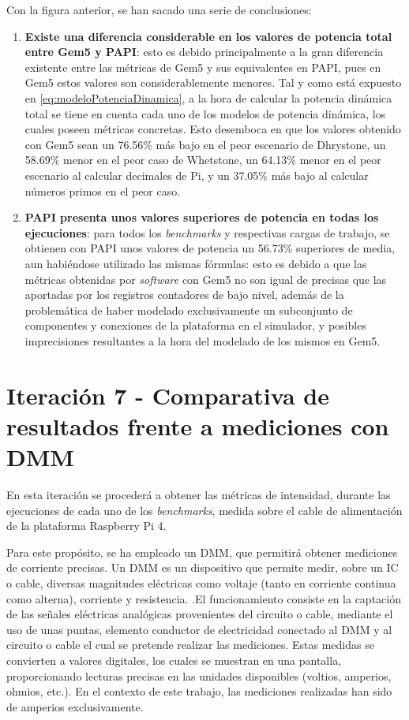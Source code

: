Con la figura anterior, se han sacado una serie de conclusiones:

\begin{enumerate}%
    \item \textbf{Existe una diferencia considerable en los valores de potencia total entre Gem5 y PAPI}: esto es debido principalmente a la gran diferencia existente entre las métricas de Gem5 y sus equivalentes en PAPI, pues en Gem5 estos valores son considerablemente menores. Tal y como está expuesto en \ref{eq:modeloPotenciaDinamica}, a la hora de calcular la potencia dinámica total se tiene en cuenta cada uno de los modelos de potencia dinámica, los cuales poseen métricas concretas. Esto desemboca en que los valores obtenido con Gem5 sean un 76.56\% más bajo en el peor escenario de Dhrystone, un 58.69\% menor en el peor caso de Whetstone, un 64.13\% menor en el peor escenario al calcular decimales de Pi, y un 37.05\% más bajo al calcular números primos en el peor caso.

    \item \textbf{PAPI presenta unos valores superiores de potencia en todas los ejecuciones}: para todos los \textit{benchmarks} y respectivas cargas de trabajo, se obtienen con PAPI unos valores de potencia un 56.73\% superiores de media, aun habiéndose utilizado las mismas fórmulas: esto es debido a que las métricas obtenidas por \textit{software} con Gem5 no son igual de precisas que las aportadas por los registros contadores de bajo nivel, además de la problemática de haber modelado exclusivamente un subconjunto de componentes y conexiones de la plataforma en el simulador, y posibles imprecisiones resultantes a la hora del modelado de los mismos en Gem5.
\end{enumerate}

\section{Iteración 7 - Comparativa de resultados frente a mediciones con DMM}

En esta iteración se procederá a obtener las métricas de intensidad, durante las ejecuciones de cada uno de los \textit{benchmarks}, medida sobre el cable de alimentación de la plataforma Raspberry Pi 4. 

Para este propósito, se ha empleado un \ac{DMM}, que permitirá obtener mediciones de corriente precisas. Un DMM es un dispositivo que permite medir, sobre un \ac{IC} o cable, diversas magnitudes eléctricas como voltaje (tanto en corriente continua como alterna), corriente y resistencia. \cite{funcionamiento-dmm}.El funcionamiento consiste en la captación de las señales eléctricas analógicas provenientes del circuito o cable, mediante el uso de unas puntas, elemento conductor de electricidad conectado al DMM y al circuito o cable el cual se pretende realizar las mediciones. Estas medidas se convierten a valores digitales, los cuales se muestran en una pantalla, proporcionando lecturas precisas en las unidades disponibles (voltios, amperios, ohmios, etc.). En el contexto de este trabajo, las mediciones realizadas han sido de amperios exclusivamente.


